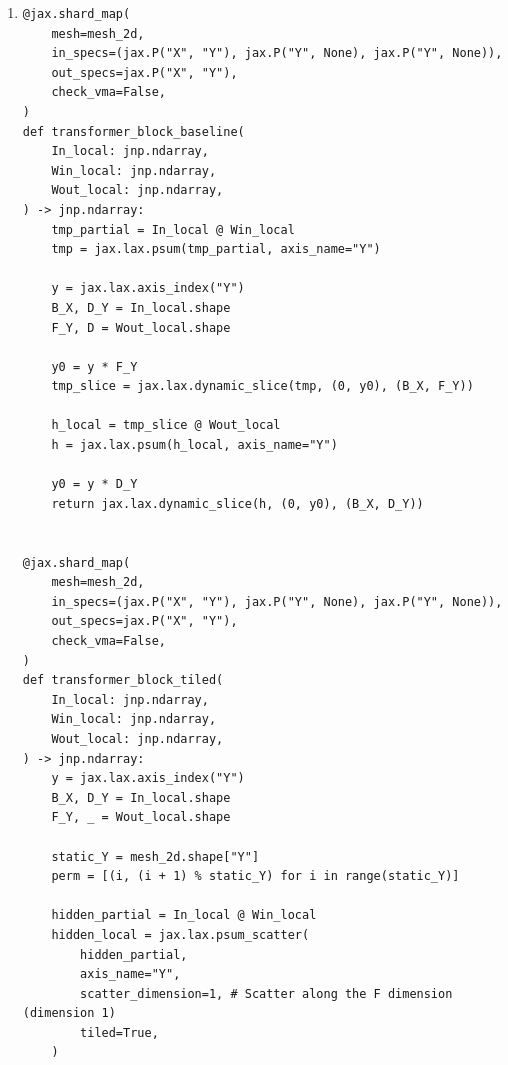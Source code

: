 \documentclass[11pt]{article}
\begin{document}
\begin{enumerate}
\begin{lstlisting}[style=pythoncode]
    static_Y = mesh_2d.shape["Y"]
    perm = [(i, (i + 1) % static_Y) for i in range(static_Y)]

    def contribution_for_tile(tile_owner):
        d0 = tile_owner * D4_tile
        W_tile = jax.lax.dynamic_slice(
            W2_local,
            (0, d0),
            (F_Y, D4_tile),
        )
        return (Tmp_local @ W_tile).astype(Q32_RING_ACCUM_DTYPE)

    tile_owner = (y - 1) % static_Y
    accum = contribution_for_tile(tile_owner)

    for _ in range(static_Y - 1):
        accum = jax.lax.ppermute(accum, axis_name="Y", perm=perm)
        tile_owner = (tile_owner - 1) % static_Y
        accum = (accum + contribution_for_tile(tile_owner)).astype(Q32_RING_ACCUM_DTYPE)

    return accum.astype(Tmp_local.dtype)
\end{lstlisting}

  \item
\begin{lstlisting}[style=pythoncode]
@jax.shard_map(
    mesh=mesh_2d,
    in_specs=(jax.P("X", "Y"), jax.P("Y", None), jax.P("Y", None)),
    out_specs=jax.P("X", "Y"),
    check_vma=False,
)
def transformer_block_baseline(
    In_local: jnp.ndarray,
    Win_local: jnp.ndarray,
    Wout_local: jnp.ndarray,
) -> jnp.ndarray:
    tmp_partial = In_local @ Win_local
    tmp = jax.lax.psum(tmp_partial, axis_name="Y")

    y = jax.lax.axis_index("Y")
    B_X, D_Y = In_local.shape
    F_Y, D = Wout_local.shape

    y0 = y * F_Y
    tmp_slice = jax.lax.dynamic_slice(tmp, (0, y0), (B_X, F_Y))

    h_local = tmp_slice @ Wout_local
    h = jax.lax.psum(h_local, axis_name="Y")

    y0 = y * D_Y
    return jax.lax.dynamic_slice(h, (0, y0), (B_X, D_Y))


@jax.shard_map(
    mesh=mesh_2d,
    in_specs=(jax.P("X", "Y"), jax.P("Y", None), jax.P("Y", None)),
    out_specs=jax.P("X", "Y"),
    check_vma=False,
)
def transformer_block_tiled(
    In_local: jnp.ndarray,
    Win_local: jnp.ndarray,
    Wout_local: jnp.ndarray,
) -> jnp.ndarray:
    y = jax.lax.axis_index("Y")
    B_X, D_Y = In_local.shape
    F_Y, _ = Wout_local.shape

    static_Y = mesh_2d.shape["Y"]
    perm = [(i, (i + 1) % static_Y) for i in range(static_Y)]

    hidden_partial = In_local @ Win_local
    hidden_local = jax.lax.psum_scatter(
        hidden_partial,
        axis_name="Y",
        scatter_dimension=1, # Scatter along the F dimension (dimension 1)
        tiled=True,
    )


\end{lstlisting}
\end{enumerate}
\end{document}
